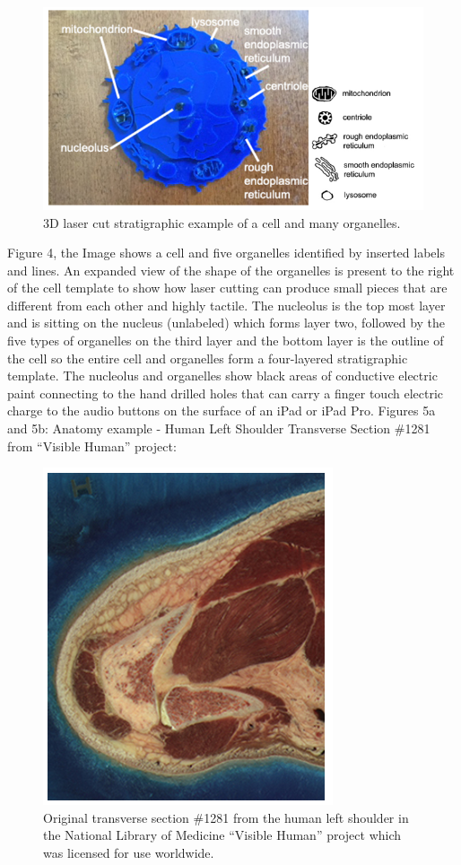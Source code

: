 \documentclass[11.5pt]{sig-alternate} %
\begin{document}
\begin{large}
\begin{figure}[h]
    \centering
    \includegraphics[width=1\linewidth]{fig 4.png}
    \caption{3D laser cut stratigraphic example of a cell and many organelles.}
\end{figure}
  
Figure 4, the Image shows a cell and five organelles identified by inserted labels and lines. An expanded view of the shape of the organelles is present to the right of the cell template to show how laser cutting can produce small pieces that are different from each other and highly tactile.  The nucleolus is the top most layer and is sitting on the nucleus (unlabeled) which forms layer two, followed by the five types of organelles on the third layer and the bottom layer is the outline of the cell so the entire cell and organelles form a four-layered stratigraphic template.  The nucleolus and organelles show black areas of conductive electric paint connecting to the hand drilled holes that can carry a finger touch electric charge to the audio buttons on the surface of an iPad or iPad Pro.
\newpage
{Figures 5a and 5b: Anatomy example - Human Left Shoulder Transverse Section \#1281 from “Visible Human” project: }
 
\begin{figure}[h] \ContinuedFloat*
   \centering
 \includegraphics[width=0.5\linewidth]{fig 5a.png}
    \caption{Original transverse section \#1281 from the human left shoulder in the National Library of Medicine “Visible Human” project which was licensed for use worldwide.}
\end{figure}


\end{large}
\end{document}
